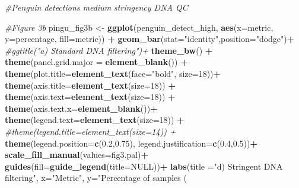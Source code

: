 \documentclass[]{article}
\newenvironment{Shaded}{\begin{snugshade}}{\end{snugshade}}
\newcommand{\KeywordTok}[1]{\textcolor[rgb]{0.13,0.29,0.53}{\textbf{#1}}}
\newcommand{\DataTypeTok}[1]{\textcolor[rgb]{0.13,0.29,0.53}{#1}}
\newcommand{\DecValTok}[1]{\textcolor[rgb]{0.00,0.00,0.81}{#1}}
\newcommand{\FloatTok}[1]{\textcolor[rgb]{0.00,0.00,0.81}{#1}}
\newcommand{\StringTok}[1]{\textcolor[rgb]{0.31,0.60,0.02}{#1}}
\newcommand{\CommentTok}[1]{\textcolor[rgb]{0.56,0.35,0.01}{\textit{#1}}}
\newcommand{\OtherTok}[1]{\textcolor[rgb]{0.56,0.35,0.01}{#1}}
\newcommand{\OperatorTok}[1]{\textcolor[rgb]{0.81,0.36,0.00}{\textbf{#1}}}
\newcommand{\NormalTok}[1]{#1}
\begin{document}
\begin{Shaded}
\begin{Highlighting}[]
\CommentTok{#Penguin detections medium stringency DNA QC}

\CommentTok{#Figure 3b}
\NormalTok{pingu_fig3b <-}\StringTok{ }\KeywordTok{ggplot}\NormalTok{(penguin_detect_high, }\KeywordTok{aes}\NormalTok{(}\DataTypeTok{x=}\NormalTok{metric, }\DataTypeTok{y=}\NormalTok{percentage, }\DataTypeTok{fill=}\NormalTok{metric)) }\OperatorTok{+}
\StringTok{  }\KeywordTok{geom_bar}\NormalTok{(}\DataTypeTok{stat=}\StringTok{"identity"}\NormalTok{,}\DataTypeTok{position=}\StringTok{"dodge"}\NormalTok{)}\OperatorTok{+}
\StringTok{  }\CommentTok{#ggtitle("a) Standard DNA filtering")+}
\StringTok{  }\KeywordTok{theme_bw}\NormalTok{() }\OperatorTok{+}\StringTok{ }\KeywordTok{theme}\NormalTok{(}\DataTypeTok{panel.grid.major =} \KeywordTok{element_blank}\NormalTok{()) }\OperatorTok{+}
\StringTok{  }\KeywordTok{theme}\NormalTok{(}\DataTypeTok{plot.title=}\KeywordTok{element_text}\NormalTok{(}\DataTypeTok{face=}\StringTok{"bold"}\NormalTok{, }\DataTypeTok{size=}\DecValTok{18}\NormalTok{))}\OperatorTok{+}
\StringTok{  }\KeywordTok{theme}\NormalTok{(}\DataTypeTok{axis.title=}\KeywordTok{element_text}\NormalTok{(}\DataTypeTok{size=}\DecValTok{18}\NormalTok{)) }\OperatorTok{+}\StringTok{ }\KeywordTok{theme}\NormalTok{(}\DataTypeTok{axis.text=}\KeywordTok{element_text}\NormalTok{(}\DataTypeTok{size=}\DecValTok{18}\NormalTok{)) }\OperatorTok{+}
\StringTok{  }\KeywordTok{theme}\NormalTok{(}\DataTypeTok{axis.text.x=}\KeywordTok{element_blank}\NormalTok{())}\OperatorTok{+}
\StringTok{  }\KeywordTok{theme}\NormalTok{(}\DataTypeTok{legend.text=}\KeywordTok{element_text}\NormalTok{(}\DataTypeTok{size=}\DecValTok{18}\NormalTok{)) }\OperatorTok{+}\StringTok{ }\CommentTok{#theme(legend.title=element_text(size=14)) +}
\StringTok{  }\KeywordTok{theme}\NormalTok{(}\DataTypeTok{legend.position=}\KeywordTok{c}\NormalTok{(}\FloatTok{0.2}\NormalTok{,}\FloatTok{0.75}\NormalTok{), }\DataTypeTok{legend.justification=}\KeywordTok{c}\NormalTok{(}\FloatTok{0.4}\NormalTok{,}\FloatTok{0.5}\NormalTok{))}\OperatorTok{+}
\StringTok{  }\KeywordTok{scale_fill_manual}\NormalTok{(}\DataTypeTok{values=}\NormalTok{fig3.pal)}\OperatorTok{+}
\StringTok{  }\KeywordTok{guides}\NormalTok{(}\DataTypeTok{fill=}\KeywordTok{guide_legend}\NormalTok{(}\DataTypeTok{title=}\OtherTok{NULL}\NormalTok{))}\OperatorTok{+}
\StringTok{  }\KeywordTok{labs}\NormalTok{(}\DataTypeTok{title =}\StringTok{"d) Stringent DNA filtering"}\NormalTok{, }\DataTypeTok{x=}\StringTok{"Metric"}\NormalTok{, }\DataTypeTok{y=}\StringTok{"Percentage of samples (%)"}\NormalTok{) }\OperatorTok{+}
}
\end{Highlighting}
\end{Shaded}
\end{document}
